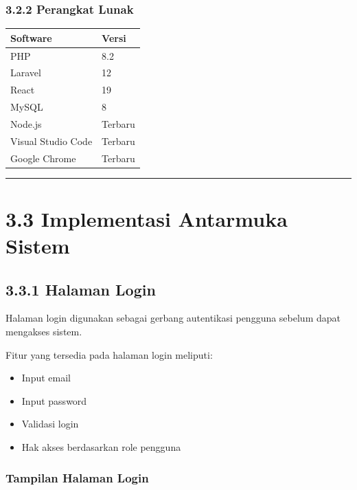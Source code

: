\subsubsection{3.2.2 Perangkat Lunak}\label{perangkat-lunak}

{\def\LTcaptype{none} %
\begin{longtable}[]{@{}ll@{}}
\toprule\noalign{}
Software & Versi \\
\midrule\noalign{}
\endhead
\bottomrule\noalign{}
\endlastfoot
PHP & 8.2 \\
Laravel & 12 \\
React & 19 \\
MySQL & 8 \\
Node.js & Terbaru \\
Visual Studio Code & Terbaru \\
Google Chrome & Terbaru \\
\end{longtable}
}

\begin{center}\rule{0.5\linewidth}{0.5pt}\end{center}

\section{3.3 Implementasi Antarmuka Sistem}\label{implementasi-antarmuka-sistem}

\subsection{3.3.1 Halaman Login}\label{halaman-login}

Halaman login digunakan sebagai gerbang autentikasi pengguna sebelum dapat mengakses sistem.

Fitur yang tersedia pada halaman login meliputi:

\begin{itemize}
\tightlist
\item
  Input email
\item
  Input password
\item
  Validasi login
\item
  Hak akses berdasarkan role pengguna
\end{itemize}

\subsubsection{Tampilan Halaman Login}\label{tampilan-halaman-login}

